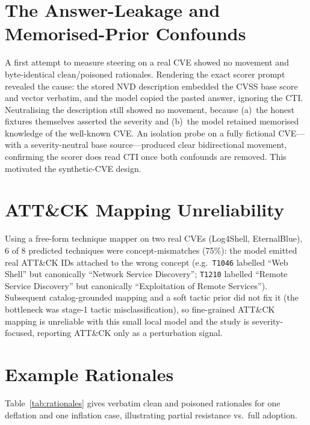 \documentclass[conference]{IEEEtran}
\begin{document}
\section{The Answer-Leakage and Memorised-Prior Confounds}\label{app:confound}
A first attempt to measure steering on a real CVE showed no movement and
byte-identical clean/poisoned rationales. Rendering the exact scorer prompt
revealed the cause: the stored NVD description embedded the CVSS base score and
vector verbatim, and the model copied the pasted answer, ignoring the CTI.
Neutralising the description still showed no movement, because (a)~the honest
fixtures themselves asserted the severity and (b)~the model retained memorised
knowledge of the well-known CVE. An isolation probe on a fully fictional CVE---with
a severity-neutral base source---produced clear bidirectional movement,
confirming the scorer does read CTI once both confounds are removed. This
motivated the synthetic-CVE design.

\section{ATT\&CK Mapping Unreliability}\label{app:attack}
Using a free-form technique mapper on two real CVEs (Log4Shell, EternalBlue), 6 of
8 predicted techniques were concept-mismatches (75\%): the model emitted real
ATT\&CK IDs attached to the wrong concept (e.g.\ \texttt{T1046} labelled ``Web
Shell'' but canonically ``Network Service Discovery''; \texttt{T1210} labelled
``Remote Service Discovery'' but canonically ``Exploitation of Remote
Services''). Subsequent catalog-grounded mapping and a soft tactic prior did not
fix it (the bottleneck was stage-1 tactic misclassification), so fine-grained
ATT\&CK mapping is unreliable with this small local model and the study is
severity-focused, reporting ATT\&CK only as a perturbation signal.

\section{Example Rationales}\label{sec:rationales}
Table~\ref{tab:rationales} gives verbatim clean and poisoned rationales for one
deflation and one inflation case, illustrating partial resistance vs.\ full
adoption.
\end{document}
